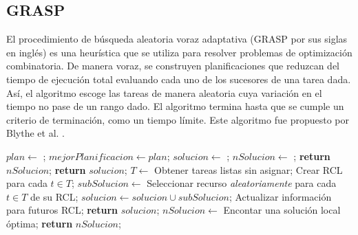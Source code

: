 
\subsection{GRASP}
\label{alg:grasp}
El procedimiento de búsqueda aleatoria voraz adaptativa (GRASP por sus siglas en inglés) es una heurística que se utiliza para resolver problemas de optimización combinatoria. De manera voraz, se construyen planificaciones que reduzcan del tiempo de ejecución total evaluando cada uno de los sucesores de una tarea dada. Así, el algoritmo escoge las tareas de manera aleatoria cuya variación en el tiempo no pase de un rango dado. El algoritmo termina hasta que se cumple un criterio de terminación, como un tiempo límite. Este algoritmo fue propuesto por Blythe et al. \cite{blythe2005task}.

\begin{algorithmic}[1]
	\State $plan \gets$ ;
		\State $mejorPlanificacion \gets plan$;
	\EndIf
\EndWhile
{}
	\State $solucion \gets$ ;
	\State $nSolucion \gets$ ;
		\State \textbf{return} $nSolucion$;
	\EndIf
	\State \textbf{return} $solucion$;
\EndProcedure
{}
		\State $T \gets$ Obtener tareas listas sin asignar;
		\State Crear RCL para cada $t \in T$;
		\State $subSolucion \gets$ Seleccionar recurso \emph{aleatoriamente} para cada $t \in T$ de su RCL;
		\State $solucion \gets solucion \cup subSolucion$;
		\State Actualizar información para futuros RCL;
	\EndWhile
	\State \textbf{return} $solucion$;
\EndProcedure
{}
	\State $nSolucion \gets$ Encontar una solución local óptima;
	\State \textbf{return} $nSolucion$;
\EndProcedure
\end{algorithmic}

